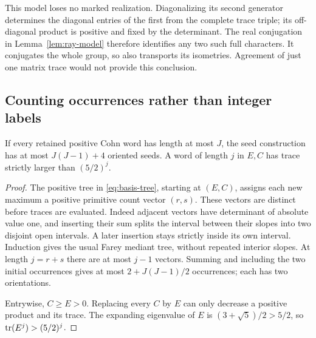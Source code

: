This model loses no marked realization. Diagonalizing its second
generator determines the diagonal entries of the first from the complete
trace triple; its off-diagonal product is positive and fixed by the
determinant. The real conjugation in Lemma~\ref{lem:ray-model} therefore
identifies any two such full characters. It conjugates the whole group,
so also transports its isometries. Agreement of just one matrix trace
would not provide this conclusion.

\subsection{Counting occurrences rather than integer labels}

\begin{lemma}\label{lem:seed-count}
If every retained positive Cohn word has length at most $J$, the seed
construction has at most $J(J-1)+4$ oriented seeds. A word of length
$j$ in $E,C$ has trace strictly larger than $(5/2)^j$.
\end{lemma}

\begin{proof}
The positive tree in \eqref{eq:basis-tree}, starting at $(E,C)$,
assigns each new maximum a positive primitive count vector $(r,s)$.
These vectors are distinct before traces are evaluated. Indeed adjacent
vectors have determinant of absolute value one, and inserting their sum
splits the interval between their slopes into two disjoint open intervals.
A later insertion stays strictly inside its own interval. Induction gives
the usual Farey mediant tree, without repeated interior slopes. At length
$j=r+s$ there are at most $j-1$ vectors. Summing and including the two
initial occurrences gives at most $2+J(J-1)/2$ occurrences; each has two
orientations.

Entrywise, $C\geqslant E>0$. Replacing every $C$ by $E$ can only decrease
a positive product and its trace. The expanding eigenvalue of $E$ is
$(3+\sqrt5)/2>5/2$, so $\operatorname{tr}(E^j)>(5/2)^j$.
\end{proof}

